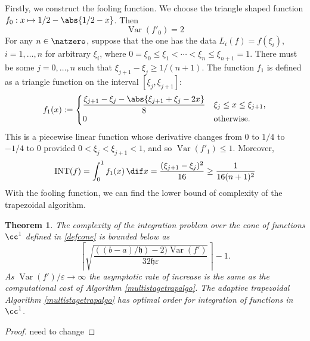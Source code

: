 \documentclass[draft]{iitthesis}
\DeclareMathOperator{\Var}{Var}
\DeclareMathOperator{\INT}{INT}
\newtheorem{theorem}{Theorem}
\theoremstyle{definition}
\theoremstyle{remark}
\newcommand{\Fnorm}[1]{\abs{#1}_{\cf}}
\newcommand{\Ftnorm}[1]{\abs{#1}_{\tcf}}
\begin{document}
Firstly, we construct the fooling function. We choose the triangle shaped function $f_0: x \mapsto 1/2-\abs{1/2-x}$. Then
\begin{equation*}
  \Var(f'_0)=2
\end{equation*}
For any $n \in \natzero$, suppose that the one has the data $L_i(f)=f(\xi_i)$, $i=1, \ldots, n$ for arbitrary $\xi_i$, where $0=\xi_0 \le \xi_1 < \cdots < \xi_n \le \xi_{n+1} = 1$.  There must be some $j=0, \ldots, n$ such that $\xi_{j+1} - \xi_j \ge 1/(n+1)$.  The function $f_{1}$ is defined as a triangle function on the interval $[\xi_j, \xi_{j+1}]$:
$$
f_{1}(x):=\begin{cases} \displaystyle
\frac{\xi_{j+1}-\xi_{j}-\abs{\xi_{j+1}+\xi_{j}-2x}}{8} & \xi_{j} \le x \leq \xi_{j+1},\\
0 & \text{otherwise}.
\end{cases}
$$
This is a piecewise linear function whose derivative changes from $0$ to $1/4$ to $-1/4$ to $0$ provided $0 < \xi_j < \xi_{j+1} < 1$, and so $\Var(f'_1)\le 1$. Moreover,
\begin{gather*}
\INT(f)=\int_0^1 f_1(x) \, \dif x = \frac{(\xi_{j+1} - \xi_j)^2}{16} \ge \frac{1}{16(n+1)^2}
\end{gather*}
With the fooling function, we can find the lower bound of complexity of the trapezoidal algorithm.

\begin{theorem} \label{comptrap}
The complexity of the integration problem over the cone of functions $\cc^1$ defined in \eqref{defcone} is bounded below as
\begin{equation}\label{complowbdtrap}
 \left \lceil \sqrt{\frac{((b-a)/\mathfrak{h})-2)\Var(f')}{32 \mathfrak{h} \varepsilon}} \right \rceil -1 .
\end{equation}
As $\Var(f')/\varepsilon \rightarrow \infty$ the asymptotic rate of increase is the same as the computational cost of Algorithm \ref{multistagetrapalgo}. The adaptive trapezoidal Algorithm \ref{multistagetrapalgo} has optimal order for integration of functions in $\cc^1$.
\end{theorem}
\begin{proof}
  need to change
\end{proof}
\end{document}
